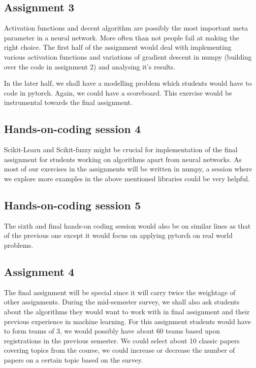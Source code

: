 \documentclass{article} %
\begin{document}
\subsection{Assignment 3}

Activation functions and decent algorithm are possibly the
most important meta parameter in a neural network. More often than not
people fail at making the right choice. The first half of the
assignment would deal with implementing various activation functions
and variations of gradient descent in numpy (building over the code
in assignment 2) and analysing it's results.

In the later half, we shall have a modelling problem which students
would have to code in pytorch. Again, we could have a scoreboard.
This exercise would be instrumental towards the final assignment.


\subsection{Hands-on-coding session 4}

Scikit-Learn and Scikit-fuzzy might be crucial for implementation
of the final assignment for students working on algorithms apart from
neural networks. As most of our exercises in the assignments will be
written in numpy, a session where we explore more examples in the above
mentioned libraries could be very helpful.

\subsection{Hands-on-coding session 5}

The sixth and final hands-on coding session would also be on similar
lines as that of the previous one except it would focus on applying
pytorch on real world problems.

\subsection{Assignment 4}

The final assignment will be special since it will carry twice the
weightage of other assignments. During the mid-semester survey,
we shall also ask students about the algorithms they would want
to work with in final assignment and their previous experience in
machine learning. For this assignment students would have to
form teams of 3, we would possibly have about 60 teams based upon
registrations in the previous semester. We could select about 10
classic papers covering topics from the course, we could increase
or decrease the number of papers on a certain topic based on the survey.
\end{document}
